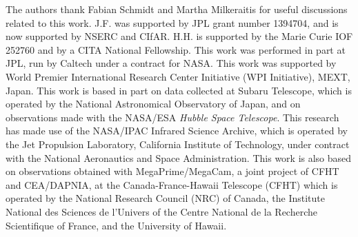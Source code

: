 \documentclass[iop]{emulateapj}
\begin{document}
\vspace{10.pt}

The authors thank Fabian Schmidt and Martha Milkeraitis for useful discussions related to this work. J.F. was supported by JPL grant number 1394704, and is now supported by NSERC and CIfAR. H.H. is supported by the Marie Curie IOF 252760 and by a CITA National Fellowship. This work was performed in part at JPL, run by Caltech under a contract for NASA. This work was supported by World Premier International Research Center Initiative (WPI Initiative), MEXT, Japan. This work is based in part on data collected at Subaru Telescope, which is operated by the National Astronomical Observatory of Japan, and on observations made with the NASA/ESA {\it Hubble Space Telescope}. This research has made use of the NASA/IPAC Infrared Science Archive, which is operated by the Jet Propulsion Laboratory, California Institute of Technology, under contract with the National Aeronautics and Space Administration. This work is also based on observations obtained with MegaPrime/MegaCam, a joint project of CFHT and CEA/DAPNIA, at the Canada-France-Hawaii Telescope (CFHT) which is operated by the National Research Council (NRC) of Canada, the Institute National des Sciences de l'Univers of the Centre National de la Recherche Scientifique of France, and the University of Hawaii.


%
%

\end{document}
